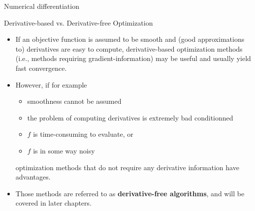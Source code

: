 \documentclass[11pt,compress,t,notes=noshow, xcolor=table]{beamer}
\begin{document}
\begin{vbframe}{Numerical differentiation}
  
  
  \end{vbframe}
  
  \begin{vbframe}{Derivative-based vs. Derivative-free Optimization }
  
  \begin{itemize}
    \item If an objective function is assumed to be smooth and (good approximations to) derivatives are easy to compute, derivative-based optimization methods (i.e., methods requiring gradient-information) may be useful and usually yield fast convergence. 
    \item However, if for example
    \begin{itemize}
      \item smoothness cannot be assumed
      \item the problem of computing derivatives is extremely bad conditionned
      \item $f$ is time-consuming to evaluate, or 
      \item $f$ is in some way noisy
    \end{itemize}
    optimization methods that do not require any derivative information have advantages. 
  \footnotesize	
    \item Those methods are referred to as \textbf{derivative-free algorithms}, and will be covered in later chapters. 
  \end{itemize}
  
  \end{vbframe}
  
  
  
  
  
  
\end{document}
